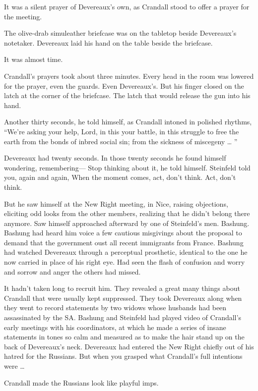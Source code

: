 It was a silent prayer of Devereaux’s own, as Crandall stood to offer a prayer for the meeting.

The olive-drab simuleather briefcase was on the tabletop beside Devereaux’s notetaker. Devereaux laid his hand on the table beside the briefcase.

It was almost time.

Crandall’s prayers took about three minutes. Every head in the room was lowered for the prayer, even the guards. Even Devereaux’s. But his finger closed on the latch at the corner of the briefcase. The latch that would release the gun into his hand.

Another thirty seconds, he told himself, as Crandall intoned in polished rhythms, “We’re asking your help, Lord, in this your battle, in this struggle to free the earth from the bonds of inbred social sin; from the sickness of miscegeny … ”

Devereaux had twenty seconds. In those twenty seconds he found himself wondering, remembering— Stop thinking about it, he told himself. Steinfeld told you, again and again, When the moment comes, act, don’t think. Act, don’t think.

But he saw himself at the New Right meeting, in Nice, raising objections, eliciting odd looks from the other members, realizing that he didn’t belong there anymore. Saw himself approached afterward by one of Steinfeld’s men. Bashung. Bashung had heard him voice a few cautious misgivings about the proposal to demand that the government oust all recent immigrants from France. Bashung had watched Devereaux through a perceptual prosthetic, identical to the one he now carried in place of his right eye. Had seen the flash of confusion and worry and sorrow and anger the others had missed.

It hadn’t taken long to recruit him. They revealed a great many things about Crandall that were usually kept suppressed. They took Devereaux along when they went to record statements by two widows whose husbands had been assassinated by the SA. Bashung and Steinfeld had played video of Crandall’s early meetings with his coordinators, at which he made a series of insane statements in tones so calm and measured as to make the hair stand up on the back of Devereaux’s neck. Devereaux had entered the New Right chiefly out of his hatred for the Russians. But when you grasped what Crandall’s full intentions were …

Crandall made the Russians look like playful imps.

